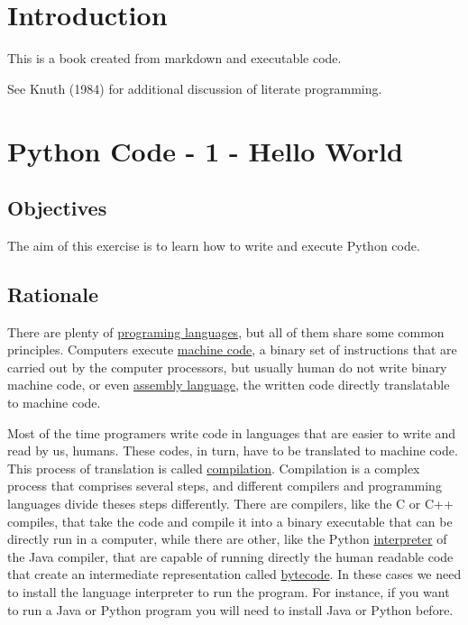 \documentclass[
  letterpaper,
  DIV=11,
  numbers=noendperiod]{scrreprt}
\theoremstyle{remark}
\begin{document}

\chapter{Introduction}\label{introduction}

This is a book created from markdown and executable code.

See Knuth (1984) for additional discussion of literate programming.


\chapter{Python Code - 1 - Hello
World}\label{python-code---1---hello-world}

\section{Objectives}\label{objectives}

The aim of this exercise is to learn how to write and execute Python
code.

\section{Rationale}\label{rationale}

There are plenty of
\href{https://en.wikipedia.org/wiki/List_of_programming_languages}{programing
languages}, but all of them share some common principles. Computers
execute \href{https://en.wikipedia.org/wiki/Machine_code}{machine code},
a binary set of instructions that are carried out by the computer
processors, but usually human do not write binary machine code, or even
\href{https://en.wikipedia.org/wiki/Assembly_language}{assembly
language}, the written code directly translatable to machine code.

Most of the time programers write code in languages that are easier to
write and read by us, humans. These codes, in turn, have to be
translated to machine code. This process of translation is called
\href{https://en.wikipedia.org/wiki/Compiler}{compilation}. Compilation
is a complex process that comprises several steps, and different
compilers and programming languages divide theses steps differently.
There are compilers, like the C or C++ compiles, that take the code and
compile it into a binary executable that can be directly run in a
computer, while there are other, like the Python
\href{https://en.wikipedia.org/wiki/Interpreter_(computing)}{interpreter}
of the Java compiler, that are capable of running directly the human
readable code that create an intermediate representation called
\href{https://en.wikipedia.org/wiki/Bytecode}{bytecode}. In these cases
we need to install the language interpreter to run the program. For
instance, if you want to run a Java or Python program you will need to
install Java or Python before.
\end{document}
